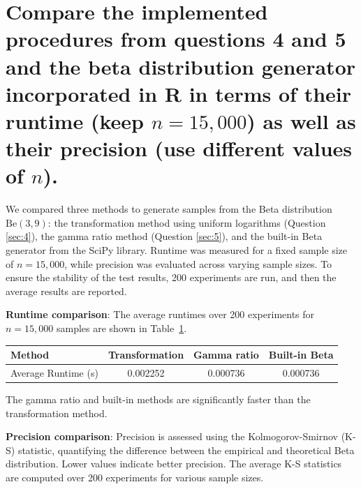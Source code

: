 \newpage

\section{Compare the implemented procedures from questions 4 and 5 and the beta distribution generator incorporated in R in terms of their runtime (keep $n = 15,\!000$) as well as their precision (use different values of $n$).}

 We compared three methods to generate samples from the Beta distribution $\text{Be}(3, 9)$: the transformation method using uniform logarithms (Question \ref{sec:4}), the gamma ratio method (Question \ref{sec:5}), and the built-in Beta generator from the SciPy library. Runtime was measured for a fixed sample size of \(n=15,\!000\), while precision was evaluated across varying sample sizes. To ensure the stability of the test results, 200 experiments are run, and then the average results are reported.




\textbf{Runtime comparison}: The average runtimes over 200 experiments for \(n = 15,000\) samples are shown in Table~\ref{tab:runtime}.

\begin{table}[H]
\centering
\footnotesize
{}
\label{tab:runtime}
\begin{tabular}{lccc}
\hline
Method & Transformation & Gamma ratio & Built-in Beta \\
\hline
Average Runtime (s) & 0.002252 & 0.000736 & 0.000736 \\
\hline
\end{tabular}
\end{table}

The gamma ratio and built-in methods are significantly faster than the transformation method.

\textbf{Precision comparison}: Precision is assessed using the Kolmogorov-Smirnov (K-S) statistic, quantifying the difference between the empirical and theoretical Beta distribution. Lower values indicate better precision. The average K-S statistics are computed over 200 experiments for various sample sizes.


